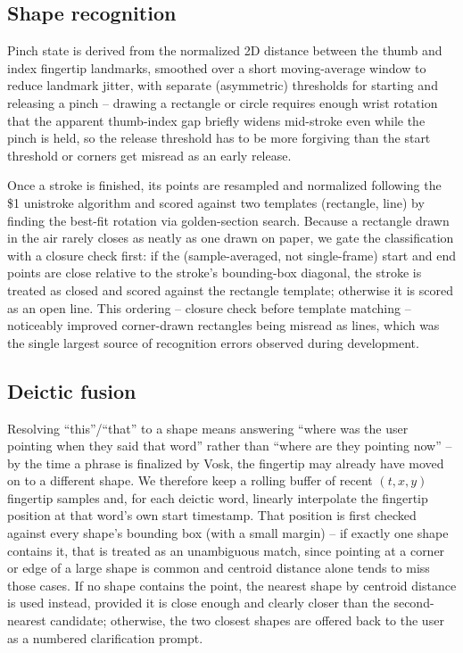 \documentclass[sigconf]{acmart}
\begin{document}
\subsection{Shape recognition}
Pinch state is derived from the normalized 2D distance between the thumb
and index fingertip landmarks, smoothed over a short moving-average window
to reduce landmark jitter, with separate (asymmetric) thresholds for
starting and releasing a pinch -- drawing a rectangle or circle requires
enough wrist rotation that the apparent thumb-index gap briefly widens
mid-stroke even while the pinch is held, so the release threshold has to
be more forgiving than the start threshold or corners get misread as an
early release.

Once a stroke is finished, its points are resampled and normalized
following the \$1 unistroke algorithm \cite{wobbrock2007} and scored
against two templates (rectangle, line) by finding the best-fit rotation
via golden-section search. Because a rectangle drawn in the air rarely
closes as neatly as one drawn on paper, we gate the classification with a
closure check first: if the (sample-averaged, not single-frame) start and
end points are close relative to the stroke's bounding-box diagonal, the
stroke is treated as closed and scored against the rectangle template;
otherwise it is scored as an open line. This ordering -- closure check
before template matching -- noticeably improved corner-drawn rectangles
being misread as lines, which was the single largest source of
recognition errors observed during development.

\subsection{Deictic fusion}
Resolving ``this''/``that'' to a shape means answering ``where was the
user pointing when they said that word'' rather than ``where are they
pointing now'' -- by the time a phrase is finalized by Vosk, the fingertip
may already have moved on to a different shape. We therefore keep a
rolling buffer of recent $(t, x, y)$ fingertip samples and, for each
deictic word, linearly interpolate the fingertip position at that word's
own start timestamp. That position is first checked against every shape's
bounding box (with a small margin) -- if exactly one shape contains it,
that is treated as an unambiguous match, since pointing at a corner or
edge of a large shape is common and centroid distance alone tends to miss
those cases. If no shape contains the point, the nearest shape by
centroid distance is used instead, provided it is close enough and
clearly closer than the second-nearest candidate; otherwise, the two
closest shapes are offered back to the user as a numbered clarification
prompt.
\end{document}
